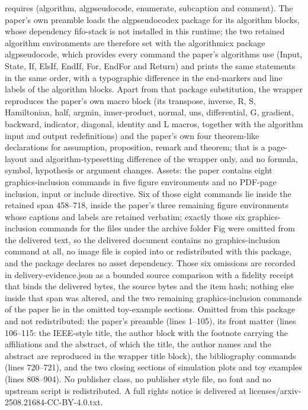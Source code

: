 \documentclass[10pt,a4paper]{amsart}
\begin{document}
requires (algorithm, algpseudocode, enumerate, subcaption and comment). The paper's own preamble loads the algpseudocodex package for its algorithm blocks, whose dependency fifo-stack is not installed in this runtime; the two retained algorithm environments are therefore set with the algorithmicx package algpseudocode, which provides every command the paper's algorithms use (Input, State, If, ElsIf, EndIf, For, EndFor and Return) and prints the same statements in the same order, with a typographic difference in the end-markers and line labels of the algorithm blocks. Apart from that package substitution, the wrapper reproduces the paper's own macro block (its transpose, inverse, R, S, Hamiltonian, half, argmin, inner-product, normal, uns, differential, G, gradient, backward, indicator, diagonal, identity and L macros, together with the algorithm input and output redefinitions) and the paper's own four theorem-like declarations for assumption, proposition, remark and theorem; that is a page-layout and algorithm-typesetting difference of the wrapper only, and no formula, symbol, hypothesis or argument changes. Assets: the paper contains eight graphics-inclusion commands in five figure environments and no PDF-page inclusion, input or include directive. Six of those eight commands lie inside the retained span 458--718, inside the paper's three remaining figure environments whose captions and labels are retained verbatim; exactly those six graphics-inclusion commands for the files under the archive folder Fig were omitted from the delivered text, so the delivered document contains no graphics-inclusion command at all, no image file is copied into or redistributed with this package, and the package declares no asset dependency. Those six omissions are recorded in delivery-evidence.json as a bounded source comparison with a fidelity receipt that binds the delivered bytes, the source bytes and the item hash; nothing else inside that span was altered, and the two remaining graphics-inclusion commands of the paper lie in the omitted toy-example sections. Omitted from this package and not redistributed: the paper's preamble (lines 1--105), its front matter (lines 106--115: the IEEE-style title, the author block with the footnote carrying the affiliations and the abstract, of which the title, the author names and the abstract are reproduced in the wrapper title block), the bibliography commands (lines 720--721), and the two closing sections of simulation plots and toy examples (lines 808--904). No publisher class, no publisher style file, no font and no upstream script is redistributed. A full rights notice is delivered at licenses/arxiv-2508.21684-CC-BY-4.0.txt.
\end{document}
